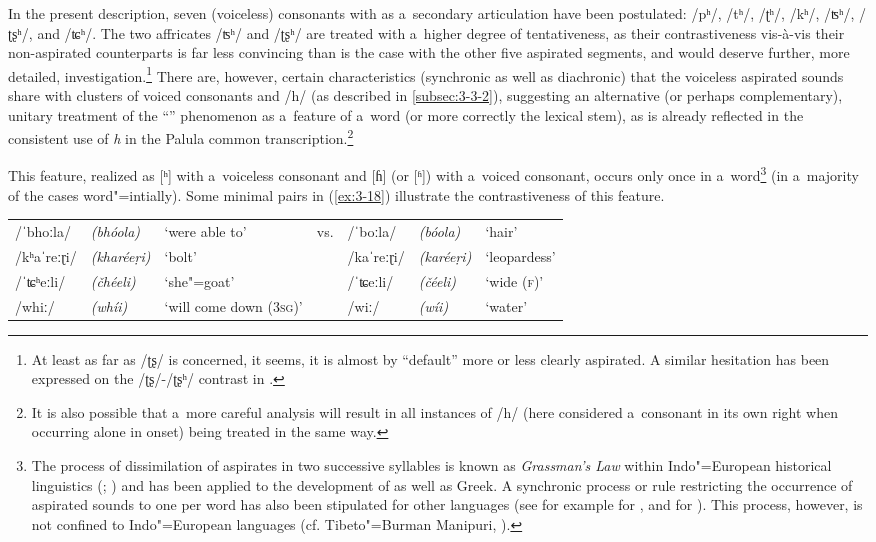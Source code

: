 In the present description, seven (voiceless) consonants with  as a~secondary articulation have been postulated: /pʰ/, /tʰ/, /ʈʰ/, /kʰ/, /ʦʰ/, /ʈʂʰ/, and /ʨʰ/. The two affricates /ʦʰ/ and /ʈʂʰ/ are treated with a~higher degree of tentativeness, as their contrastiveness vis-à-vis their non-aspirated counterparts is far less convincing than is the case with the other five aspirated segments, and would deserve further, more detailed, investigation.\footnote{At least as far as /ʈʂ/ is concerned, it seems, it is almost by ``default'' more or less clearly aspirated. A similar hesitation has been expressed on the /ʈʂ/-/ʈʂʰ/ contrast in  \citep[239]{endresenkristiansen1981}.} There are, however, certain characteristics (synchronic as well as diachronic) that the voiceless aspirated sounds share with clusters of voiced consonants and /h/ (as described in \ref{subsec:3-3-2}), suggesting an alternative (or perhaps complementary), unitary treatment of the ``'' phenomenon as a~feature of a~word (or more correctly the lexical stem), as is already reflected in the consistent use of \textit{h} in the Palula common transcription.\footnote{It is also possible that a~more careful analysis will result in all instances of /h/ (here considered a~consonant in its own right when occurring alone in  onset) being treated in the same way.} 


This feature, realized as [ʰ] with a~voiceless consonant and [ɦ] (or [ʱ]) with a~voiced consonant, occurs only once in a~word\footnote{\label{fnt:ftn32} The process of dissimilation of aspirates in two successive syllables is known as \textit{Grassman's Law} within Indo"=European historical linguistics (\citealt[19, 56]{szemerenyi1996}; \citealt[153--154, 162--163]{lehmann1992}) and has been applied to the development of  as well as Greek. A synchronic process or rule restricting the occurrence of aspirated sounds to one per word has also been stipulated for other  languages (see for example \citealt[32]{losey2002} for , and \citealt[34--35]{shackle1976} for ). This process, however, is not confined to Indo"=European languages (cf. Tibeto"=Burman Manipuri, \citealt[13--14]{bhatningomba1997}).} (in a~majority of the cases word"=intially). Some minimal pairs in (\ref{ex:3-18}) illustrate the contrastiveness of this feature.


\begin{exe}
\extab
\label{ex:3-18}
\begin{tabularx}{116mm}{ l l Q l l l Q }
/ˈbhoːla/ &
\textit{(bhóola)} &
`were able to' &
vs. &
/ˈboːla/ &
\textit{(bóola)} &
`hair'\\
/kʰaˈreːɽi/ &
\textit{(kharéeṛi)} &
`bolt' &
&
/kaˈreːɽi/ &
\textit{(karéeṛi)} &
`leop\-ardess'\\
/ˈʨʰeːli/ &
\textit{(čhéeli)} &
`she"=goat' &
&
/ˈʨeːli/ &
\textit{(čéeli)} &
`wide (\textsc{f})'\\
/whiː/
&
\textit{(whíi)}
&
`will come down (\textsc{3sg})' &
&
/wiː/
&
\textit{(wíi)}
&
`water'\\
\end{tabularx}
\end{exe}


